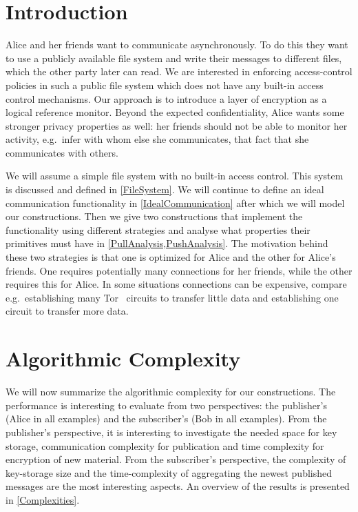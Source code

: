 \acresetall{}
\section{Introduction}\label{Introduction}

Alice and her friends want to communicate asynchronously.
To do this they want to use a publicly available file system and write their 
messages to different files, which the other party later can read.
We are interested in enforcing access-control policies in such a public file 
system which does not have any built-in access control mechanisms.
Our approach is to introduce a layer of encryption as a logical reference 
monitor.
Beyond the expected confidentiality, Alice wants some stronger privacy 
properties as well: her friends should not be able to monitor her activity, 
e.g.\ infer with whom else she communicates, that fact that she communicates 
with others.

We will assume a simple file system with no built-in access control.
This system is discussed and defined in \cref{FileSystem}.
We will continue to define an ideal communication functionality in 
\cref{IdealCommunication} after which we will model our constructions.
Then we give two constructions that implement the functionality using different 
strategies and analyse what properties their primitives must have in 
\cref{PullAnalysis,PushAnalysis}.
The motivation behind these two strategies is that one is optimized for Alice 
and the other for Alice's friends.
One requires potentially many connections for her friends, while the other 
requires this for Alice.
In some situations connections can be expensive, compare e.g.\ establishing 
many Tor~\cite{Tor} circuits to transfer little data and establishing one 
circuit to transfer more data.








\section{Algorithmic Complexity}\label{AlgComplexity}

We will now summarize the algorithmic complexity for our constructions.
The performance is interesting to evaluate from two perspectives: the 
publisher's (Alice in all examples) and the subscriber's (Bob in all examples).
From the publisher's perspective, it is interesting to investigate the needed 
space for key storage, communication complexity for publication and time 
complexity for encryption of new material.
From the subscriber's perspective, the complexity of key-storage size and the 
time-complexity of aggregating the newest published messages are the most 
interesting aspects.
An overview of the results is presented in \cref{Complexities}.

